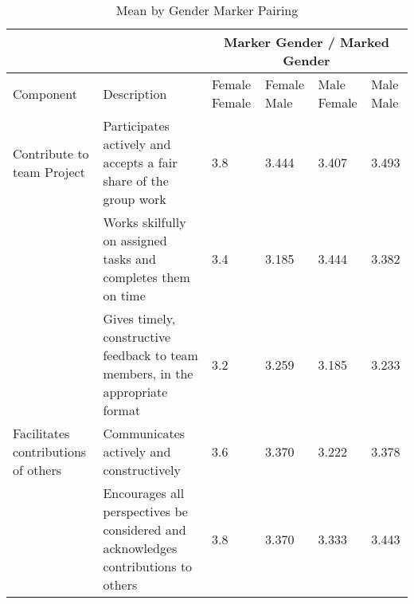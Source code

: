 \documentclass[sigconf, anonymous=true]{acmart}
\begin{document}
\begin{table*}[ht]
\caption{Mean by Gender Marker Pairing}
\begin{tabular} {| p{3cm} | p{8cm} | p{1cm}| p{1cm} | p{1cm}| p{1cm} |} 
\hline

& & \multicolumn{4}{c}{Marker Gender  / Marked Gender } \\
\hline



Component & Description & Female Female & Female Male
& Male Female & Male Male \\
\hline

Contribute to team Project          & Participates actively and accepts a fair share of the group work                                 & 3.8                                                     & 3.444                                                 & 3.407                                                 & 3.493                                               \\
\hline
                                    & Works skilfully on assigned tasks and completes them on time                                     & 3.4                                                     & 3.185                                                 & 3.444                                                 & 3.382                                               \\
\hline
                                    & Gives timely, constructive feedback to team members, in the appropriate format                   & 3.2                                                     & 3.259                                                 & 3.185                                                 & 3.233                                               \\
\hline
Facilitates contributions of others & Communicates actively and constructively                                                         & 3.6                                                     & 3.370                                                 & 3.222                                                 & 3.378                                               \\
\hline
                                    & Encourages all perspectives be considered and acknowledges contributions to others               & 3.8                                                     & 3.370                                                 & 3.333                                                 & 3.443                                               \\

\end{tabular}
\end{table*}
\end{document}
